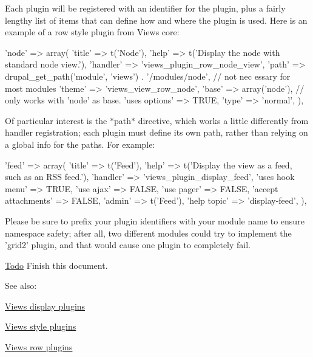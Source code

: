 Each plugin will be registered with an identifier for the plugin, plus a fairly lengthy list of items that can define how and where the plugin is used. Here is an example of a row style plugin from Views core: 
\begin{DoxyCode}
     'node' => array(
       'title' => t('Node'),
       'help' => t('Display the node with standard node view.'),
       'handler' => 'views_plugin_row_node_view',
       'path' => drupal_get_path('module', 'views') . '/modules/node', // not nec
      essary for most modules
       'theme' => 'views_view_row_node',
       'base' => array('node'), // only works with 'node' as base.
       'uses options' => TRUE,
       'type' => 'normal',
     ),
\end{DoxyCode}


Of particular interest is the $\ast$path$\ast$ directive, which works a little differently from handler registration; each plugin must define its own path, rather than relying on a global info for the paths. For example: 
\begin{DoxyCode}
    'feed' => array(
      'title' => t('Feed'),
      'help' => t('Display the view as a feed, such as an RSS feed.'),
      'handler' => 'views_plugin_display_feed',
      'uses hook menu' => TRUE,
      'use ajax' => FALSE,
      'use pager' => FALSE,
      'accept attachments' => FALSE,
      'admin' => t('Feed'),
      'help topic' => 'display-feed',
     ),
\end{DoxyCode}


Please be sure to prefix your plugin identifiers with your module name to ensure namespace safety; after all, two different modules could try to implement the 'grid2' plugin, and that would cause one plugin to completely fail.

\begin{Desc}
\item[\hyperlink{todo__todo000060}{Todo}]Finish this document.\end{Desc}
See also:
\begin{DoxyItemize}
\item \hyperlink{group__views__display__plugins}{Views display plugins }
\item \hyperlink{group__views__style__plugins}{Views style plugins }
\item \hyperlink{group__views__row__plugins}{Views row plugins } 
\end{DoxyItemize}